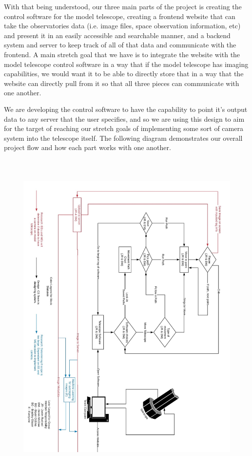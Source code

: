 \documentclass[12pt]{report}
\begin{document}
With that being understood, our three main parts of the project is creating the control software for the model telescope, creating a frontend website that can take the observatories data (i.e. image files, space observation information, etc) and present it in an easily accessible and searchable manner, and a backend system and server to keep track of all of that data and communicate with the frontend. A main stretch goal that we have is to integrate the website with the model telescope control software in a way that if the model telescope has imaging capabilities, we would want it to be able to directly store that in a way that the website can directly pull from it so that all three pieces can communicate with one another.

We are developing the control software to have the capability to point it’s output data to any server that the user specifies, and so we are using this design to aim for the target of reaching our stretch goals of implementing some sort of camera system into the telescope itself. The following diagram demonstrates our overall project flow and how each part works with one another. 

\newpage


\begin{figure}[h]
	\centering
	\includegraphics[width=1.00\linewidth, height=17.0cm]{blockpt2}
\end{figure}
\end{document}
